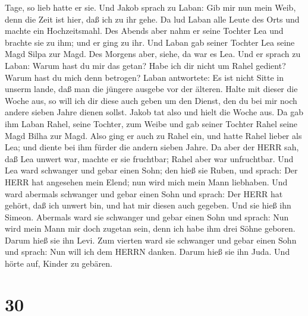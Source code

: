 Tage, so lieb hatte er sie.  Und Jakob sprach zu Laban: Gib
mir nun mein Weib, denn die Zeit ist hier, daß ich zu ihr gehe.
 Da lud Laban alle Leute des Orts und machte ein
Hochzeitsmahl.  Des Abends aber nahm er seine Tochter Lea
und brachte sie zu ihm; und er ging zu ihr.  Und Laban gab
seiner Tochter Lea seine Magd Silpa zur Magd.  Des Morgens
aber, siehe, da war es Lea. Und er sprach zu Laban: Warum hast du mir
das getan? Habe ich dir nicht um Rahel gedient? Warum hast du mich denn
betrogen?  Laban antwortete: Es ist nicht Sitte in unserm
lande, daß man die jüngere ausgebe vor der älteren.  Halte
mit dieser die Woche aus, so will ich dir diese auch geben um den
Dienst, den du bei mir noch andere sieben Jahre dienen sollst.
 Jakob tat also und hielt die Woche aus. Da gab ihm Laban
Rahel, seine Tochter, zum Weibe  und gab seiner Tochter
Rahel seine Magd Bilha zur Magd.  Also ging er auch zu
Rahel ein, und hatte Rahel lieber als Lea; und diente bei ihm fürder die
andern sieben Jahre.  Da aber der HERR sah, daß Lea unwert
war, machte er sie fruchtbar; Rahel aber war unfruchtbar. 
Und Lea ward schwanger und gebar einen Sohn; den hieß sie Ruben, und
sprach: Der HERR hat angesehen mein Elend; nun wird mich mein Mann
liebhaben.  Und ward abermals schwanger und gebar einen
Sohn und sprach: Der HERR hat gehört, daß ich unwert bin, und hat mir
diesen auch gegeben. Und sie hieß ihn Simeon.  Abermals
ward sie schwanger und gebar einen Sohn und sprach: Nun wird mein Mann
mir doch zugetan sein, denn ich habe ihm drei Söhne geboren. Darum hieß
sie ihn Levi.  Zum vierten ward sie schwanger und gebar
einen Sohn und sprach: Nun will ich dem HERRN danken. Darum hieß sie ihn
Juda. Und hörte auf, Kinder zu gebären.

\hypertarget{section-29}{%
\section{30}\label{section-29}}

